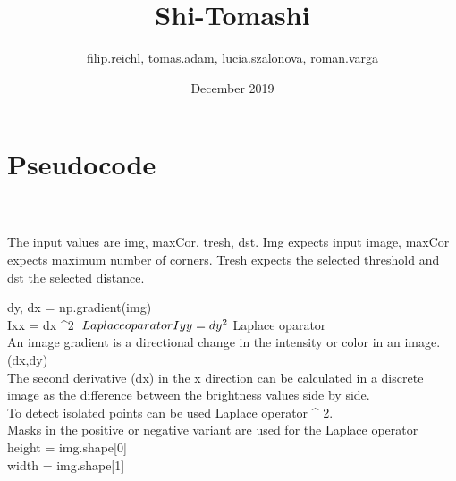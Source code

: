 \documentclass{article}
\title{Shi-Tomashi}
\author{filip.reichl, tomas.adam, lucia.szalonova, roman.varga }
\date{December 2019}
\begin{document}
\maketitle

\section{Pseudocode}
 \\
\\
The input values are img, maxCor, tresh, dst. Img expects input image, maxCor expects maximum number of corners. Tresh expects the selected threshold and dst the selected distance. \break


    dy, dx = np.gradient(img)\\
    Ixx = dx ^2$    \hspace{0,2cm} Laplace oparator \\
    Iyy = dy ^2$    \hspace{0,2cm} Laplace oparator \\
 
An image gradient is a directional change in the intensity or color in an image. (dx,dy)\\
 
The second derivative (dx) in the x direction can be calculated in a discrete image as the difference between the brightness values side by side.\\ 

To detect isolated points can be used Laplace operator \Delta ^ 2.\\ Masks \hspace{0,1cm} in \hspace{0,1cm}the \hspace{0,1cm}positive \hspace{0,1cm}or\hspace{0,1cm} negative\hspace{0,1cm} variant \hspace{0,1cm}are \hspace{0,1cm}used \hspace{0,1cm}for\hspace{0,1cm} the \hspace{0,1cm}Laplace\hspace{0,1cm} operator\\


    height = img.shape[0]\\
    width = img.shape[1]\\
\end{document}
